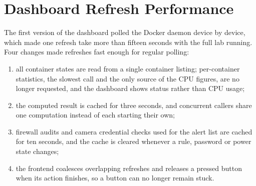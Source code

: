 \section{Dashboard Refresh Performance}
\label{app:dash}

The first version of the dashboard polled the Docker daemon device by device,
which made one refresh take more than fifteen seconds with the full lab
running. Four changes made refreshes fast enough for regular polling:

\begin{enumerate}
\item all container states are read from a single container listing;
  per-container statistics, the slowest call and the only source of the CPU
  figures, are no longer requested, and the dashboard shows status rather than
  CPU usage;
\item the computed result is cached for three seconds, and concurrent callers
  share one computation instead of each starting their own;
\item firewall audits and camera credential checks used for the alert list
  are cached for ten seconds, and the cache is cleared whenever a rule,
  password or power state changes;
\item the frontend coalesces overlapping refreshes and releases a pressed
  button when its action finishes, so a button can no longer remain stuck.
\end{enumerate}
